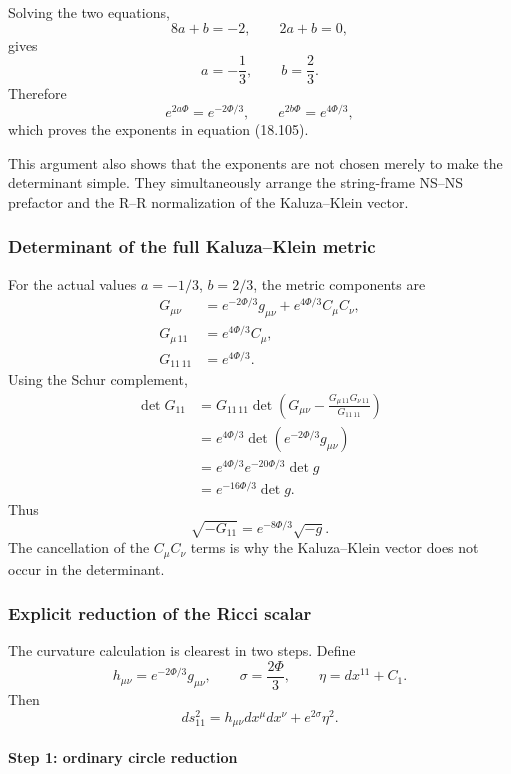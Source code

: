 \documentclass[
  10pt,
  a4paper,
  openany]{book}
\begin{document}
Solving the two equations, \[
8a+b=-2,
\qquad
2a+b=0,
\] gives \[
\boxed{
a=-\frac13,
\qquad
b=\frac23
}.
\] Therefore \[
e^{2a\Phi}=e^{-2\Phi/3},
\qquad
e^{2b\Phi}=e^{4\Phi/3},
\] which proves the exponents in equation (18.105).

This argument also shows that the exponents are not chosen merely to
make the determinant simple. They simultaneously arrange the
string-frame NS--NS prefactor and the R--R normalization of the
Kaluza--Klein vector.

\subsubsection{Determinant of the full Kaluza--Klein
metric}\label{determinant-of-the-full-kaluzaklein-metric}

For the actual values \(a=-1/3\), \(b=2/3\), the metric components are
\[
\begin{aligned}
G_{\mu\nu}
&=e^{-2\Phi/3}g_{\mu\nu}
+e^{4\Phi/3}C_\mu C_\nu,\\
G_{\mu\,11}
&=e^{4\Phi/3}C_\mu,\\
G_{11\,11}
&=e^{4\Phi/3}.
\end{aligned}
\] Using the Schur complement, \[
\begin{aligned}
\det G_{11}
&=G_{11\,11}
\det\left(
G_{\mu\nu}
-\frac{G_{\mu\,11}G_{\nu\,11}}{G_{11\,11}}
\right)\\
&=e^{4\Phi/3}
\det\left(e^{-2\Phi/3}g_{\mu\nu}\right)\\
&=e^{4\Phi/3}e^{-20\Phi/3}\det g\\
&=e^{-16\Phi/3}\det g.
\end{aligned}
\] Thus \[
\boxed{
\sqrt{-G_{11}}
=e^{-8\Phi/3}\sqrt{-g}
}.
\] The cancellation of the \(C_\mu C_\nu\) terms is why the
Kaluza--Klein vector does not occur in the determinant.

\subsubsection{Explicit reduction of the Ricci
scalar}\label{explicit-reduction-of-the-ricci-scalar}

The curvature calculation is clearest in two steps. Define \[
h_{\mu\nu}
=e^{-2\Phi/3}g_{\mu\nu},
\qquad
\sigma=\frac{2\Phi}{3},
\qquad
\eta=dx^{11}+C_1.
\] Then \[
ds_{11}^2
=h_{\mu\nu}dx^\mu dx^\nu
+e^{2\sigma}\eta^2.
\]

\paragraph{Step 1: ordinary circle
reduction}\label{step-1-ordinary-circle-reduction}
\end{document}
